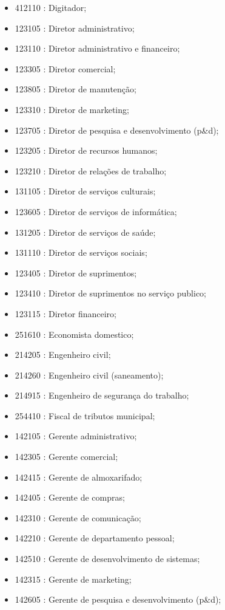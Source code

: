 \begin{itemize}
\begin{itemize}
\begin{itemize}
      \item 412110 : Digitador;
      \item 123105 : Diretor administrativo;
      \item 123110 : Diretor administrativo e financeiro;
      \item 123305 : Diretor comercial;
      \item 123805 : Diretor de manutenção;
      \item 123310 : Diretor de marketing;
      \item 123705 : Diretor de pesquisa e desenvolvimento (p\&d);
      \item 123205 : Diretor de recursos humanos;
      \item 123210 : Diretor de relações de trabalho;
      \item 131105 : Diretor de serviços culturais;
      \item 123605 : Diretor de serviços de informática;
      \item 131205 : Diretor de serviços de saúde;
      \item 131110 : Diretor de serviços sociais;
      \item 123405 : Diretor de suprimentos;
      \item 123410 : Diretor de suprimentos no serviço publico;
      \item 123115 : Diretor financeiro;
      \item 251610 : Economista domestico;
      \item 214205 : Engenheiro civil;
      \item 214260 : Engenheiro civil (saneamento);
      \item 214915 : Engenheiro de segurança do trabalho;
      \item 254410 : Fiscal de tributos municipal;
      \item 142105 : Gerente administrativo;
      \item 142305 : Gerente comercial;
      \item 142415 : Gerente de almoxarifado;
      \item 142405 : Gerente de compras;
      \item 142310 : Gerente de comunicação;
      \item 142210 : Gerente de departamento pessoal;
      \item 142510 : Gerente de desenvolvimento de sistemas;
      \item 142315 : Gerente de marketing;
      \item 142605 : Gerente de pesquisa e desenvolvimento (p\&d);

\end{itemize}
\end{itemize}
\end{itemize}
